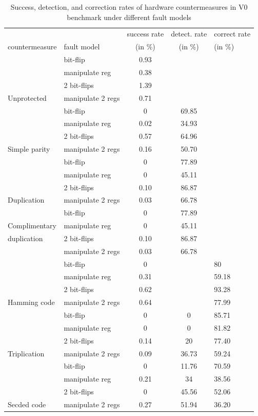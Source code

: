 \begin{table}
  \caption{Success, detection, and correction rates of hardware countermeasures in V0 benchmark under different fault models}
  \label{tab:v0 under attack result}
{%
\scriptsize
\begin{tabular}{llccl}
\hline
 &  & success rate & detect. rate & correct rate \\
\multirow{-2}{*}{countermeasure} & \multirow{-2}{*}{fault model} & (in \%) &(in \%) & (in \%)\\
\hline
 & bit-flip & 0.93 & &  \\
 & manipulate reg & 0.38 & & \\
 & 2 bit-flips & 1.39 & & \\
\multirow{-4}{*}{Unprotected} & manipulate 2 regs  & 0.71  &  & \\
\hline
 & bit-flip & 0 & 69.85 & \\
 & manipulate reg & 0.02 & 34.93 & \\
 & 2 bit-flips & 0.57 & 64.96 & \\
\multirow{-4}{*}{Simple parity} & manipulate 2 regs & 0.16 & 50.70 & \\
\hline
 & bit-flip & 0 & 77.89 & \\
 & manipulate reg & 0 & 45.11 & \\
 & 2 bit-flips & 0.10 & 86.87 & \\
\multirow{-4}{*}{Duplication} & manipulate 2 regs & 0.03 & 66.78 & \\
\hline
 & bit-flip & 0 & 77.89 & \\
Complimentary & manipulate reg & 0 & 45.11 & \\
duplication & 2 bit-flips & 0.10 & 86.87 & \\
 & manipulate 2 regs & 0.03 & 66.78 & \\
\hline
 & bit-flip & 0 & & 80 \\
 & manipulate reg & 0.31 & & 59.18 \\
 & 2 bit-flips & 0.62 & & 93.28 \\
\multirow{-4}{*}{Hamming code} & manipulate 2 regs & 0.64 & & 77.99 \\
\hline
 & bit-flip & 0 & 0 & 85.71 \\
 & manipulate reg & 0 & 0 & 81.82 \\
 & 2 bit-flips & 0.14 & 20 & 77.40 \\
\multirow{-4}{*}{Triplication} & manipulate 2 regs & 0.09 & 36.73 & 59.24 \\
\hline
 & bit-flip & 0 & 11.76 & 70.59 \\
 & manipulate reg & 0.21 & 34 & 38.56 \\
 & 2 bit-flips & 0 & 45.56 & 52.06 \\
\multirow{-4}{*}{Secded code} & manipulate 2 regs & 0.27 & 51.94 & 36.20 \\
\hline
\end{tabular}
}
\end{table}

